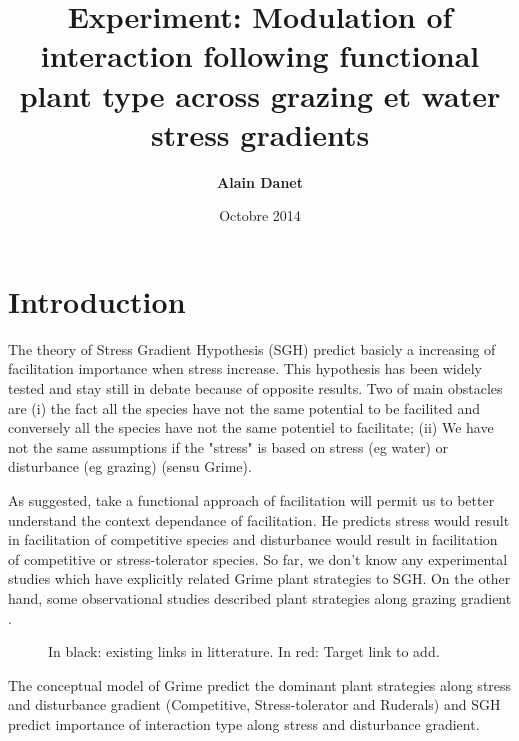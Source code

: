 \documentclass[12pt]{article} %
\title{Experiment: Modulation of interaction following functional plant type across grazing et water stress gradients}
\author{\textbf{Alain Danet}}
\date{Octobre 2014}
\begin{document}
\maketitle


\part{Introduction}
The theory of Stress Gradient Hypothesis (SGH) predict basicly a increasing of facilitation importance when stress increase. This hypothesis has been widely tested and stay still in debate because of opposite results. Two of main obstacles are (i) the fact all the species have not the same potential to be facilited and conversely all the species have not the same potentiel to facilitate; (ii) We have not the same assumptions if the "stress" is based on stress (eg water) or disturbance (eg grazing) (sensu Grime).

As \citet{Butterfield2013} suggested, take a functional approach of facilitation will permit us to better understand the context dependance of facilitation. He predicts stress would result in facilitation of competitive species and disturbance would result in facilitation of competitive or stress-tolerator species. So far, we don't know any experimental studies which have explicitly related Grime plant strategies to SGH. On the other hand, some observational studies described plant strategies along grazing gradient \citep{DIAZ2007}. 

\begin{figure}
\begin{center}
\end{center}
\caption{In black: existing links in litterature. In red: Target link to add.}
\end{figure}


The conceptual model of Grime predict the dominant plant strategies along stress and disturbance gradient (Competitive, Stress-tolerator and Ruderals) and SGH predict importance of interaction type along stress and disturbance gradient.
\end{document}
